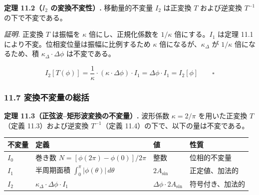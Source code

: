 \documentclass[a4paper,11pt]{ltjsarticle}
\newcounter{none}
\begin{document}
\textbf{定理 11.2（\(I_2\) の変換不変性）.} 移動量的不変量 \(I_2\)
は正変換 \(T\) および逆変換 \(T^{-1}\) の下で不変である。

\emph{証明.} 正変換 \(T\) は振幅を \(\kappa\) 倍にし、正規化係数を
\(1/\kappa\) 倍にする。\(I_1\) は定理 11.1
により不変。位相変位量は振幅に比例するため \(\kappa\)
倍になるが、\(\kappa_\Delta\) が \(1/\kappa\) 倍になるため、積
\(\kappa_\Delta \cdot \Delta\phi\) は不変である。

\[I_2[T(\phi)] = \frac{1}{\kappa} \cdot (\kappa \cdot \Delta\phi) \cdot I_1 = \Delta\phi \cdot I_1 = I_2[\phi] \qquad \square\]

\subsubsection{11.7
変換不変量の総括}\label{ux5909ux63dbux4e0dux5909ux91cfux306eux7dcfux62ec}

\textbf{定理 11.3（正弦波--矩形波変換の不変量）.} 波形係数
\(\kappa = 2/\pi\) を用いた正変換 \(T\)（定義 11.3）および逆変換
\(T^{-1}\)（定義 11.4）の下で、以下の量は不変である。

{\def\LTcaptype{none} %
\begin{longtable}[]{@{}
  >{\centering\arraybackslash}p{}
  >{\raggedright\arraybackslash}p{}
  >{\raggedright\arraybackslash}p{}
  >{\raggedright\arraybackslash}p{}@{}}
\toprule\noalign{}
\begin{minipage}[b]{\linewidth}\centering
不変量
\end{minipage} & \begin{minipage}[b]{\linewidth}\raggedright
定義
\end{minipage} & \begin{minipage}[b]{\linewidth}\raggedright
値
\end{minipage} & \begin{minipage}[b]{\linewidth}\raggedright
性質
\end{minipage} \\
\midrule\noalign{}
\endhead
\bottomrule\noalign{}
\endlastfoot
\(I_0\) & 巻き数 \(N = [\phi(2\pi) - \phi(0)] / 2\pi\) & 整数 &
位相的不変量 \\
\(I_1\) & 半周期面積 \(\int_0^{\pi} |\phi(\theta)|\, d\theta\) &
\(2A_{\sin}\) & 正定値、加法的 \\
\(I_2\) & \(\kappa_\Delta \cdot \Delta\phi \cdot I_1\) &
\(\Delta\phi \cdot 2A_{\sin}\) & 符号付き、加法的 \\
\end{longtable}
}
\end{document}

